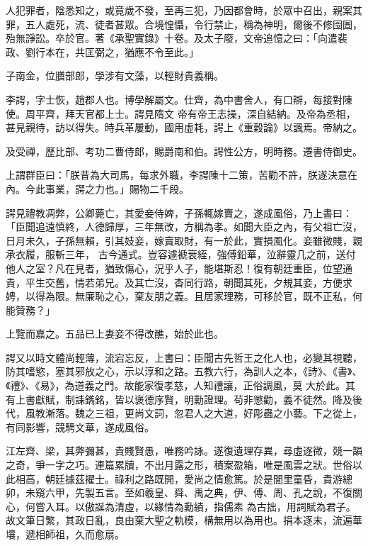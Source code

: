 \begin{pinyinscope}
 人犯罪者，陰悉知之，或竟歲不發，至再三犯，乃因都會時，於眾中召出，親案其罪，五人處死，流、徒者甚眾。合境惶懾，令行禁止，稱為神明，爾後不修囹圄，殆無諍訟。卒於官。著《承聖實錄》十卷。及太子廢，文帝追憶之曰：「向遣裴政、劉行本在，共匡弼之，猶應不令至此。」



 子南金，位膳部郎，學涉有文藻，以輕財貴義稱。



 李諤，字士恢，趙郡人也。博學解屬文。仕齊，為中書舍人，有口辯，每接對陳使。周平齊，拜天官都上士。諤見隋文
 帝有帝王志操，深自結納。及帝為丞相，甚見親待，訪以得失。時兵革屢動，國用虛耗，諤上《重穀論》以諷焉。帝納之。



 及受禪，歷比部、考功二曹侍郎，賜爵南和伯。諤性公方，明時務。遷書侍御史。



 上謂群臣曰：「朕昔為大司馬，每求外職，李諤陳十二策，苦勸不許，朕遂決意在內。今此事業，諤之力也。」賜物二千段。



 諤見禮教凋弊，公卿薨亡，其愛妾侍婢，子孫輒嫁賣之，遂成風俗，乃上書曰：「臣聞追遠慎終，人德歸厚，三年無改，方稱為孝。如聞大臣之內，有父祖亡沒，日月未久，子孫無賴，引其妓妾，嫁賣取財，有一於此，實損風化。妾雖微賤，親承衣履，服斬三年，
 古今通式。豈容遽褫衰絰，強傅鉛華，泣辭靈几之前，送付他人之室？凡在見者，猶致傷心，況乎人子，能堪斯忍！復有朝廷重臣，位望通貴，平生交舊，情若弟兄。及其亡沒，杳同行路，朝聞其死，夕規其妾，方便求娉，以得為限。無廉恥之心，棄友朋之義。且居家理務，可移於官，既不正私，何能贊務？」



 上覽而嘉之。五品已上妻妾不得改醮，始於此也。



 諤又以時文體尚輕薄，流宕忘反，上書曰：臣聞古先哲王之化人也，必變其視聽，防其嗜慾，塞其邪放之心，示以淳和之路。五教六行，為訓人之本，《詩》、《書》、《禮》、《易》，為道義之門。故能家復孝慈，人知禮讓，正俗調風，莫
 大於此。其有上書獻賦，制誄鐫銘，皆以褒德序賢，明勳證理。茍非懲勸，義不徒然。降及後代，風教漸落。魏之三祖，更尚文詞，忽君人之大道，好彫蟲之小藝。下之從上，有同影響，競騁文華，遂成風俗。



 江左齊、梁，其弊彌甚，貴賤賢愚，唯務吟詠。遂復遺理存異，尋虛逐微，競一韻之奇，爭一字之巧。連篇累牘，不出月露之形，積案盈箱，唯是風雲之狀。世俗以此相高，朝廷據茲擢士。祿利之路既開，愛尚之情愈篤。於是閭里童昏，貴游總卯，未窺六甲，先製五言。至如羲皇、舜、禹之典，伊、傅、周、孔之說，不復關心，何嘗入耳。以傲誕為清虛，以緣情為勳績，指儒素
 為古拙，用詞賦為君子。故文筆日繁，其政日亂，良由棄大聖之軌模，構無用以為用也。捐本逐末，流遍華壤，遞相師祖，久而愈扇。




\end{pinyinscope}

